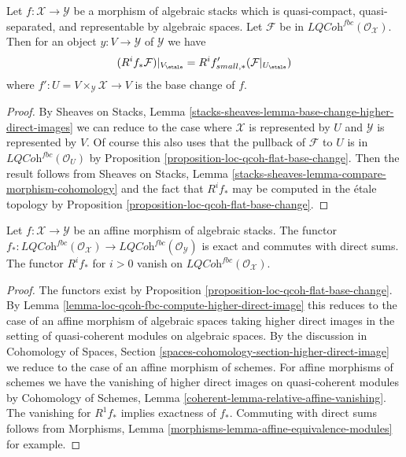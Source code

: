 \begin{lemma}
\label{lemma-loc-qcoh-fbc-compute-higher-direct-image}
Let $f : \mathcal{X} \to \mathcal{Y}$ be a morphism of algebraic stacks
which is quasi-compact, quasi-separated, and
representable by algebraic spaces. Let $\mathcal{F}$ be in
$\textit{LQCoh}^{fbc}(\mathcal{O}_\mathcal{X})$.
Then for an object $y : V \to \mathcal{Y}$ of $\mathcal{Y}$ we have
$$
(R^if_*\mathcal{F})|_{V_\etale} = R^if'_{small, *}(\mathcal{F}|_{U_\etale})
$$
where $f' : U = V \times_\mathcal{Y} \mathcal{X} \to V$ is the base
change of $f$.
\end{lemma}

\begin{proof}
By Sheaves on Stacks, Lemma
\ref{stacks-sheaves-lemma-base-change-higher-direct-images}
we can reduce to the case where $\mathcal{X}$
is represented by $U$ and $\mathcal{Y}$ is
represented by $V$. Of course this also uses that the pullback of
$\mathcal{F}$ to $U$ is in $\textit{LQCoh}^{fbc}(\mathcal{O}_U)$
by Proposition \ref{proposition-loc-qcoh-flat-base-change}.
Then the result follows from
Sheaves on Stacks, Lemma
\ref{stacks-sheaves-lemma-compare-morphism-cohomology}
and the fact that $R^if_*$ may be computed in the
\'etale topology by
Proposition \ref{proposition-loc-qcoh-flat-base-change}.
\end{proof}

\begin{lemma}
\label{lemma-loc-qcoh-fbc-affine-direct-image}
Let $f : \mathcal{X} \to \mathcal{Y}$ be an affine morphism of algebraic
stacks. The functor $f_* : \textit{LQCoh}^{fbc}(\mathcal{O}_\mathcal{X}) \to
\textit{LQCoh}^{fbc}(\mathcal{O}_\mathcal{Y})$ is exact and commutes
with direct sums. The functor $R^if_*$ for $i > 0$ vanish on
$\textit{LQCoh}^{fbc}(\mathcal{O}_\mathcal{X})$.
\end{lemma}

\begin{proof}
The functors exist by Proposition \ref{proposition-loc-qcoh-flat-base-change}.
By Lemma \ref{lemma-loc-qcoh-fbc-compute-higher-direct-image}
this reduces to the case of an affine morphism of algebraic spaces
taking higher direct images in the setting of quasi-coherent
modules on algebraic spaces. By the discussion in
Cohomology of Spaces, Section
\ref{spaces-cohomology-section-higher-direct-image}
we reduce to the case of an affine morphism of schemes.
For affine morphisms of schemes we have the vanishing of
higher direct images on quasi-coherent modules by
Cohomology of Schemes, Lemma \ref{coherent-lemma-relative-affine-vanishing}.
The vanishing for $R^1f_*$ implies exactness of $f_*$.
Commuting with direct sums follows from
Morphisms, Lemma \ref{morphisms-lemma-affine-equivalence-modules}
for example.
\end{proof}










